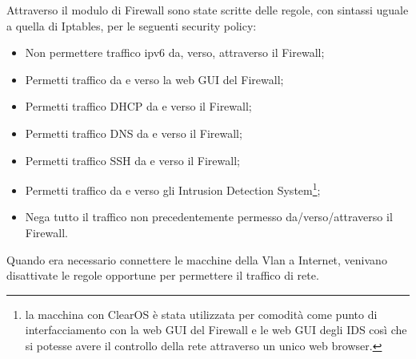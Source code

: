 Attraverso il modulo di Firewall sono state scritte delle regole, con sintassi uguale a quella di Iptables, per le seguenti security policy:
\begin{itemize}
    \item Non permettere traffico ipv6 da, verso, attraverso il Firewall;
    \item Permetti traffico  da e verso la web GUI del Firewall;
    \item Permetti traffico  DHCP da e verso il Firewall;
    \item Permetti traffico  DNS da e verso il Firewall;
    \item Permetti traffico  SSH da e verso il Firewall;
    \item Permetti traffico da e verso gli Intrusion Detection System\footnote{la macchina con ClearOS è stata utilizzata per comodità come  punto di interfacciamento con la web GUI del Firewall e le web GUI degli IDS così che si potesse avere il controllo della rete attraverso un unico web browser.};
    \item Nega tutto il traffico non precedentemente permesso da/verso/attraverso il Firewall.
\end{itemize}

Quando era necessario connettere le macchine della Vlan a Internet, venivano disattivate le regole opportune per permettere il traffico di rete. 

